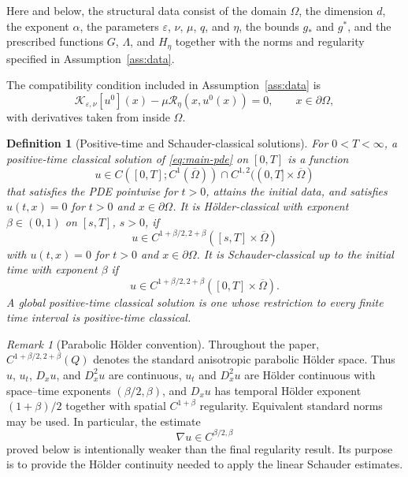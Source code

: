 \documentclass[11pt]{article}
\newtheorem{definition}[theorem]{Definition}
\theoremstyle{remark}
\newtheorem{remark}[theorem]{Remark}
\newcommand{\eps}{\varepsilon}
\newcommand{\nupar}{\nu}
\newcommand{\cK}{\mathcal{K}}
\newcommand{\cT}{\mathcal{R}}
\begin{document}
Here and below, the structural data consist of the domain $\Omega$, the
dimension $d$, the exponent $\alpha$, the parameters $\eps$, $\nupar$,
$\mu$, $q$, and $\eta$, the bounds $g_*$ and $g^*$, and the prescribed
functions $G$, $\Lambda$, and $H_\eta$ together with the norms and
regularity specified in Assumption~\ref{ass:data}.

The compatibility condition included in Assumption~\ref{ass:data} is
\begin{equation}\label{eq:compatibility}
        \cK_{\eps,\nupar}[u^0](x)-\mu\cT_\eta(x,u^0(x))=0,
        \qquad x\in\partial\Omega,
\end{equation}
with derivatives taken from inside $\Omega$.



\begin{definition}[Positive-time and Schauder-classical solutions]\label{def:classical}
For $0<T<\infty$, a positive-time classical solution of \eqref{eq:main-pde} on $[0,T]$ is a function
\[
        u\in C([0,T];C^1(\overline\Omega))\cap C^{1,2}((0,T]\times\overline\Omega)
\]
that satisfies the PDE pointwise for $t>0$, attains the initial data, and satisfies $u(t,x)=0$ for $t>0$ and $x\in\partial\Omega$.  It is H\"older-classical with exponent $\beta\in(0,1)$ on $[s,T]$, $s>0$, if
\[
        u\in C^{1+\beta/2,2+\beta}([s,T]\times\overline\Omega)
\]
with $u(t,x)=0$ for $t>0$ and $x\in\partial\Omega$.  It is Schauder-classical up to the initial time with exponent $\beta$ if
\[
        u\in C^{1+\beta/2,2+\beta}([0,T]\times\overline\Omega).
\]  A global positive-time classical solution is one whose restriction to every finite time interval is positive-time classical.
\end{definition}

\begin{remark}[Parabolic H\"older convention]\label{rem:holder-convention}
Throughout the paper, $C^{1+\beta/2,2+\beta}(Q)$ denotes the standard
anisotropic parabolic H\"older space.  Thus $u$, $u_t$, $D_xu$, and
$D_x^2u$ are continuous, $u_t$ and $D_x^2u$ are H\"older continuous with
space--time exponents $(\beta/2,\beta)$, and $D_xu$ has temporal H\"older
exponent $(1+\beta)/2$ together with spatial $C^{1+\beta}$ regularity.
Equivalent standard norms may be used.  In particular, the estimate
\[
\nabla u \in C^{\beta/2,\beta}
\]
proved below is intentionally weaker than the final regularity result. Its purpose is to provide the H\"older continuity needed to apply the linear Schauder estimates.
\end{remark}
\end{document}
